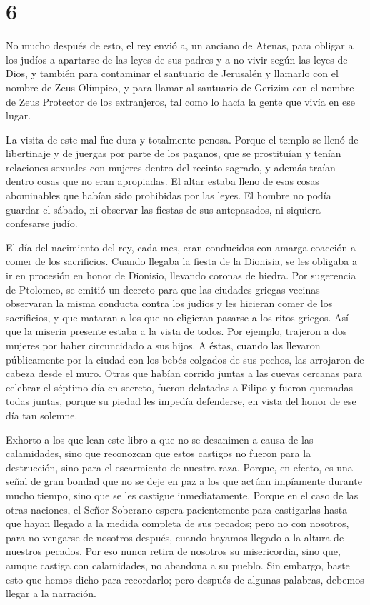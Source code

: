 \hypertarget{section-5}{%
\section{6}\label{section-5}}

 No mucho después de esto, el rey envió a, un anciano de
Atenas, para obligar a los judíos a apartarse de las leyes de sus padres
y a no vivir según las leyes de Dios,  y también para
contaminar el santuario de Jerusalén y llamarlo con el nombre de Zeus
Olímpico, y para llamar al santuario de Gerizim con el nombre de Zeus
Protector de los extranjeros, tal como lo hacía la gente que vivía en
ese lugar.

 La visita de este mal fue dura y totalmente penosa.
 Porque el templo se llenó de libertinaje y de juergas por
parte de los paganos, que se prostituían y tenían relaciones sexuales
con mujeres dentro del recinto sagrado, y además traían dentro cosas que
no eran apropiadas.  El altar estaba lleno de esas cosas
abominables que habían sido prohibidas por las leyes.  El
hombre no podía guardar el sábado, ni observar las fiestas de sus
antepasados, ni siquiera confesarse judío.

 El día del nacimiento del rey, cada mes, eran conducidos
con amarga coacción a comer de los sacrificios. Cuando llegaba la fiesta
de la Dionisia, se les obligaba a ir en procesión en honor de Dionisio,
llevando coronas de hiedra.  Por sugerencia de Ptolomeo,
se emitió un decreto para que las ciudades griegas vecinas observaran la
misma conducta contra los judíos y les hicieran comer de los
sacrificios,  y que mataran a los que no eligieran pasarse
a los ritos griegos. Así que la miseria presente estaba a la vista de
todos.  Por ejemplo, trajeron a dos mujeres por haber
circuncidado a sus hijos. A éstas, cuando las llevaron públicamente por
la ciudad con los bebés colgados de sus pechos, las arrojaron de cabeza
desde el muro.  Otras que habían corrido juntas a las
cuevas cercanas para celebrar el séptimo día en secreto, fueron
delatadas a Filipo y fueron quemadas todas juntas, porque su piedad les
impedía defenderse, en vista del honor de ese día tan solemne.

 Exhorto a los que lean este libro a que no se desanimen
a causa de las calamidades, sino que reconozcan que estos castigos no
fueron para la destrucción, sino para el escarmiento de nuestra raza.
 Porque, en efecto, es una señal de gran bondad que no se
deje en paz a los que actúan impíamente durante mucho tiempo, sino que
se les castigue inmediatamente.  Porque en el caso de las
otras naciones, el Señor Soberano espera pacientemente para castigarlas
hasta que hayan llegado a la medida completa de sus pecados; pero no con
nosotros,  para no vengarse de nosotros después, cuando
hayamos llegado a la altura de nuestros pecados.  Por eso
nunca retira de nosotros su misericordia, sino que, aunque castiga con
calamidades, no abandona a su pueblo.  Sin embargo, baste
esto que hemos dicho para recordarlo; pero después de algunas palabras,
debemos llegar a la narración.

